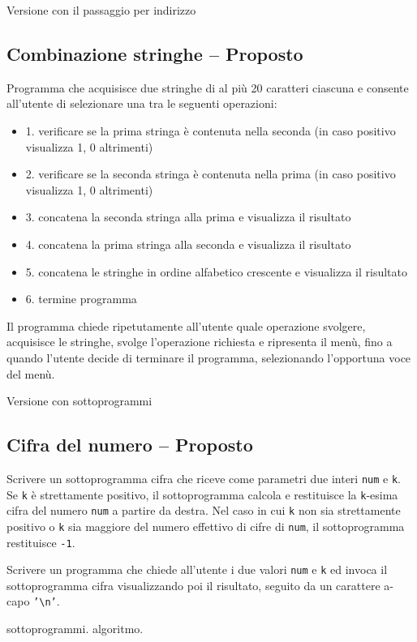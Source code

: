 
Versione con il passaggio per indirizzo



\prosep{}

\subsection{Combinazione stringhe -- Proposto}
Programma che acquisisce due stringhe di al pi\`u 20 caratteri ciascuna e consente all'utente di selezionare una tra le seguenti operazioni:\begin{itemize}
\item 1. verificare se la prima stringa \`e contenuta nella seconda (in caso positivo visualizza 1, 0 altrimenti)
\item 2. verificare se la seconda stringa \`e contenuta nella prima (in caso positivo visualizza 1, 0 altrimenti)
\item 3. concatena la seconda stringa alla prima e visualizza il risultato
\item 4. concatena la prima stringa alla seconda e visualizza il risultato
\item 5. concatena le stringhe in ordine alfabetico crescente e visualizza il risultato
\item 6. termine programma
\end{itemize}
Il programma chiede ripetutamente all'utente quale operazione svolgere, acquisisce le stringhe, svolge l'operazione richiesta e ripresenta il men\`u, fino a quando l'utente decide di terminare il programma, selezionando l'opportuna voce del men\`u.



Versione con sottoprogrammi



\subsection{Cifra del numero -- Proposto}
Scrivere un sottoprogramma cifra che riceve come parametri due interi \texttt{num} e \texttt{k}. Se \texttt{k} \`e strettamente positivo, il sottoprogramma calcola e restituisce la \texttt{k}-esima cifra del numero \texttt{num} a partire da destra. Nel caso in cui \texttt{k} non sia strettamente positivo o \texttt{k} sia maggiore del numero effettivo di cifre di \texttt{num}, il sottoprogramma restituisce \texttt{-1}.

Scrivere un programma che chiede all'utente i due valori \texttt{num} e \texttt{k} ed invoca il sottoprogramma cifra visualizzando poi il risultato, seguito da un carattere a-capo \texttt{'\textbackslash n'}.

\begin{tags}
sottoprogrammi. algoritmo.
\end{tags}


